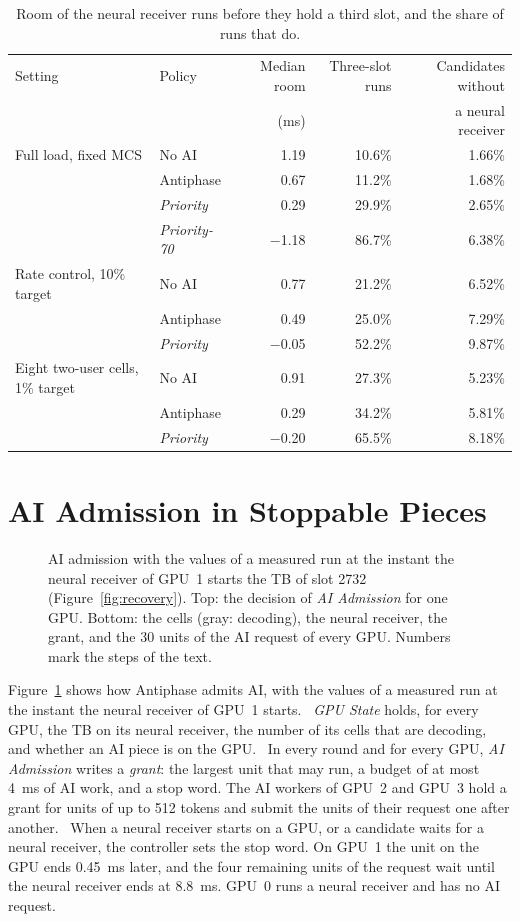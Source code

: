 \documentclass[acmsmall,screen,review,anonymous]{acmart}
\newcommand{\sys}{Antiphase\xspace}
\begin{document}
\begin{table}[t]
\caption{Room of the neural receiver runs before they hold a third slot, and the share of runs that do.}
\label{tab:slack}
\footnotesize
\begin{tabular}{@{}llrrr@{}}
\toprule
Setting & Policy & Median room & Three-slot runs & Candidates without \\
 & & (ms) & & a neural receiver \\
\midrule
Full load, fixed MCS & No AI & 1.19 & 10.6\% & 1.66\% \\
 & \sys & 0.67 & 11.2\% & 1.68\% \\
 & \textit{Priority} & 0.29 & 29.9\% & 2.65\% \\
 & \textit{Priority-70} & $-$1.18 & 86.7\% & 6.38\% \\
Rate control, 10\% target & No AI & 0.77 & 21.2\% & 6.52\% \\
 & \sys & 0.49 & 25.0\% & 7.29\% \\
 & \textit{Priority} & $-$0.05 & 52.2\% & 9.87\% \\
Eight two-user cells, 1\% target & No AI & 0.91 & 27.3\% & 5.23\% \\
 & \sys & 0.29 & 34.2\% & 5.81\% \\
 & \textit{Priority} & $-$0.20 & 65.5\% & 8.18\% \\
\bottomrule
\end{tabular}
\end{table}

\section{AI Admission in Stoppable Pieces}
\label{sec:admission}

\begin{figure}[t]
\centering
\resizebox{\linewidth}{!}{}
\caption{AI admission with the values of a measured run at the instant the neural receiver of GPU~1 starts
the TB of slot 2732 (Figure~\ref{fig:recovery}). Top: the decision of \textit{AI Admission} for one GPU.
Bottom: the cells (gray: decoding), the neural receiver, the grant, and the 30 units of the AI request of
every GPU. Numbers mark the steps of the text.}
\label{fig:admission}
\end{figure}

Figure~\ref{fig:admission} shows how \sys admits AI, with the values of a measured run at the instant the
neural receiver of GPU~1 starts. ~\textit{GPU State} holds, for every GPU, the TB on its neural
receiver, the number of its cells that are decoding, and whether an AI piece is on the GPU.
~In every round and for every GPU, \textit{AI Admission} writes a \emph{grant}: the largest unit
that may run, a budget of at most 4~ms of AI work, and a stop word. The AI workers of GPU~2 and GPU~3 hold a
grant for units of up to 512 tokens and submit the units of their request one after another.
~When a neural receiver starts on a GPU, or a candidate waits for a neural receiver, the controller
sets the stop word. On GPU~1 the unit on the GPU ends 0.45~ms later, and the four remaining units of the
request wait until the neural receiver ends at 8.8~ms. GPU~0 runs a neural receiver and has no AI request.
\end{document}
